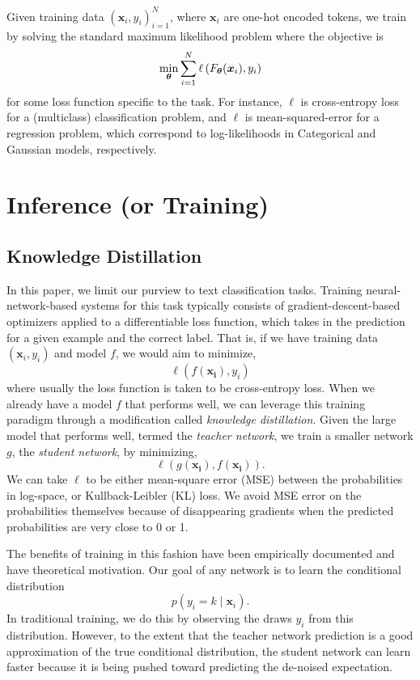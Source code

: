 \documentclass[10pt]{article}
\newcommand{\btheta}{{\bm{\theta}}}
\begin{document}
Given training data $(\bm x_i, y_i)_{i=1}^N$, where $\bm x_i$ are one-hot
encoded tokens, we train by solving the standard maximum likelihood problem
where the objective is \[
\min_{\btheta} \sum_{i=1}^N \ell\pr{F_\btheta(\bm x_i), y_i}
\]
for some loss function specific to the task. For instance, $\ell$ is
cross-entropy loss for a (multiclass) classification problem, and $\ell$ is
mean-squared-error for a regression problem, which correspond to
log-likelihoods in Categorical and Gaussian models, respectively. 



\section{Inference (or Training)}
\label{sec:training}


\subsection{Knowledge Distillation}
\label{subsec:kd}

In this paper, we limit our purview to text classification tasks. Training
neural-network-based systems for this task typically consists of
gradient-descent-based optimizers applied to a differentiable loss
function, which takes in the prediction for a given example and the correct label. That is, if we have
training data $(\bm{x}_i, y_i)$ and model $f$, we would aim to minimize,
\[ \ell(f(\bm{x_i}), y_i)\]
where usually the loss function is taken to be cross-entropy loss. When we
already have a model $f$ that performs well, we can leverage this training
paradigm through a modification called \emph{knowledge distillation}. Given
the large model that performs well, termed the \emph{teacher network}, we
train a smaller network $g$, the \emph{student network}, by minimizing,
\[ \ell(g(\bm{x_i}), f(\bm{x_i})).\]
We can take
$\ell$ to be either mean-square error (MSE) between the probabilities in
log-space, or Kullback-Leibler (KL) loss. We avoid MSE error on the
probabilities themselves because of disappearing gradients when the predicted
probabilities are very close to 0 or 1.

The benefits of training in this fashion have been empirically documented
\citep{hinton2015distilling} and have theoretical motivation. Our goal of any
network is to learn the conditional distribution 
\[ p(y_i = k \mid \bm{x}_i).\]
In traditional training, we do this by observing the draws $y_i$ from this
distribution. However, to the extent that the teacher network prediction is a
good approximation of the true conditional distribution, the student network
can learn faster because it is being pushed toward predicting the de-noised
expectation.
\end{document}
